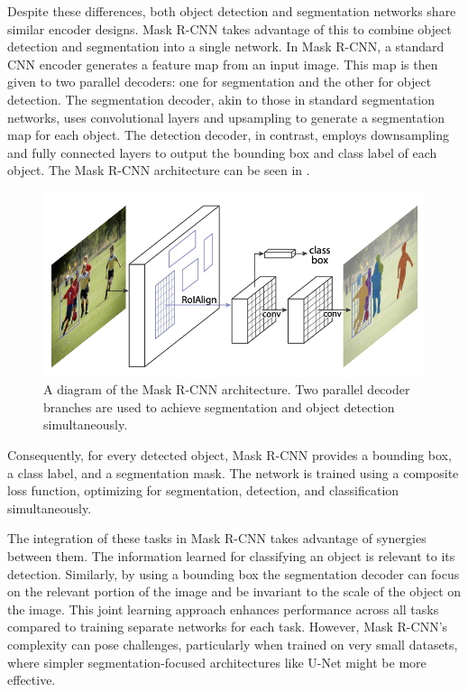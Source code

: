 Despite these differences, both object detection and segmentation networks share similar encoder designs. Mask R-CNN \cite{heMaskRCNN2017b} takes advantage of this to combine object detection and segmentation into a single network. In Mask R-CNN, a standard CNN encoder generates a feature map from an input image. This map is then given to two parallel decoders: one for segmentation and the other for object detection. The segmentation decoder, akin to those in standard segmentation networks, uses convolutional layers and upsampling to generate a segmentation map for each object. The detection decoder, in contrast, employs downsampling and fully connected layers to output the bounding box and class label of each object. The Mask R-CNN architecture can be seen in .

 \begin{figure}[t!]
 \centering
 \includegraphics[width=0.6\linewidth]{images/maskrcnn-arch}
 \caption{A diagram of the Mask R-CNN architecture. Two parallel decoder branches are used to achieve segmentation and object detection simultaneously. \cite{heMaskRCNN2017b}}
 \label{fig:maskrcnn-arch}
 \end{figure}

Consequently, for every detected object, Mask R-CNN provides a bounding box, a class label, and a segmentation mask. The network is trained using a composite loss function, optimizing for segmentation, detection, and classification simultaneously.

The integration of these tasks in Mask R-CNN takes advantage of synergies between them. The information learned for classifying an object is relevant to its detection. Similarly, by using a bounding box the segmentation decoder can focus on the relevant portion of the image and be invariant to the scale of the object on the image. This joint learning approach enhances performance across all tasks compared to training separate networks for each task. However, Mask R-CNN's complexity can pose challenges, particularly when trained on very small datasets, where simpler segmentation-focused architectures like U-Net might be more effective.

